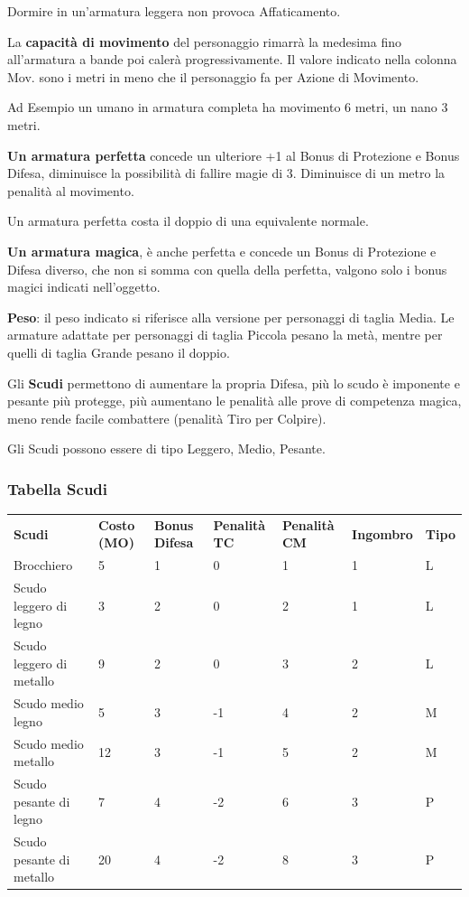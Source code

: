 \documentclass[a4paper,11pt,twoside,openany]{book}
\begin{document}
Dormire in un'armatura leggera non provoca Affaticamento.

La \textbf{capacità di movimento} del personaggio rimarrà la medesima fino all'armatura a bande poi calerà progressivamente. Il valore indicato nella colonna Mov. sono i metri in meno che il personaggio fa per Azione di Movimento.

Ad Esempio un umano in armatura completa ha movimento 6 metri, un nano 3 metri.

\textbf{Un armatura perfetta} concede un ulteriore +1 al Bonus di Protezione e Bonus Difesa, diminuisce la possibilità di fallire magie di 3. Diminuisce di un metro la penalità al movimento.

Un armatura perfetta costa il doppio di una equivalente normale.

\textbf{Un armatura magica}, è anche perfetta e concede un Bonus di Protezione e Difesa diverso, che non si somma con quella della perfetta, valgono solo i bonus magici indicati nell'oggetto.

\textbf{Peso}: il peso indicato si riferisce alla versione per personaggi di taglia Media. Le armature adattate per personaggi di taglia Piccola pesano la metà, mentre per quelli di taglia Grande pesano il doppio.

\pagebreak

Gli \textbf{Scudi} permettono di aumentare la propria Difesa, più lo scudo è imponente e pesante più protegge, più aumentano le penalità alle prove di competenza magica, meno rende facile combattere (penalità Tiro per Colpire).

Gli Scudi possono essere di tipo Leggero, Medio, Pesante.

\subsubsection{Tabella Scudi}

\label{tabella-scudi}
\medskip
\begin{tabular}{lllllll}
	\toprule
	\textbf{Scudi} & \textbf{Costo (MO)} & \textbf{Bonus Difesa} & \textbf{Penalità TC} & \textbf{Penalità CM} & \textbf{Ingombro} & \textbf{Tipo}\tabularnewline
	Brocchiero& 5    & 1 & 0& 1& 1  & L\tabularnewline
	Scudo leggero di legno   & 3    & 2 & 0& 2& 1  & L\tabularnewline
	Scudo leggero di metallo & 9    & 2 & 0& 3& 2  & L\tabularnewline
	Scudo medio legno   & 5    & 3 & -1    & 4& 2  & M\tabularnewline
	Scudo medio metallo & 12   & 3 & -1    & 5& 2  & M\tabularnewline
	Scudo pesante di legno   & 7    & 4 & -2    & 6& 3  & P\tabularnewline
	Scudo pesante di metallo & 20   & 4 & -2    & 8& 3  & P\tabularnewline
\end{tabular}
\end{document}

